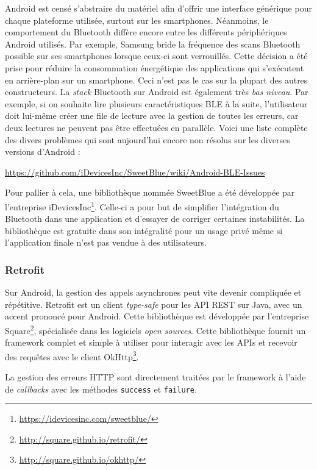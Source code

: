 Android est censé s'abstraire du matériel afin d'offrir une interface générique pour chaque plateforme utilisée, surtout sur les smartphones. Néanmoins, le comportement du Bluetooth diffère encore entre les différents périphériques Android utilisés. Par exemple, Samsung bride la fréquence des scans Bluetooth possible sur ses smartphones lorsque ceux-ci sont verrouillés. Cette décision a été prise pour réduire la consommation énergétique des applications qui s'exécutent en arrière-plan sur un smartphone. Ceci n'est pas le cas sur la plupart des autres constructeurs. La \textit{stack} Bluetooth sur Android est également très \textit{bas niveau}. Par exemple, si on souhaite lire plusieurs caractéristiques BLE à la suite, l'utilisateur doit lui-même créer une file de lecture avec la gestion de toutes les erreurs, car deux lectures ne peuvent pas être effectuées en parallèle. Voici une liste complète des divers problèmes qui sont aujourd'hui encore non résolus sur les diverses versions d'Android :
\begin{center}
    \url{https://github.com/iDevicesInc/SweetBlue/wiki/Android-BLE-Issues}
\end{center}

Pour pallier à cela, une bibliothèque nommée SweetBlue a été développée par l'entreprise iDevicesInc\footnote{\url{https://idevicesinc.com/sweetblue/}}. Celle-ci a pour but de simplifier l'intégration du Bluetooth dans une application et d'essayer de corriger certaines instabilités. La bibliothèque est gratuite dans son intégralité pour un usage privé même si l'application finale n'est pas vendue à des utilisateurs.


\subsubsection{Retrofit}

Sur Android, la gestion des appels asynchrones peut vite devenir compliquée et répétitive. Retrofit est un client \textit{type-safe} pour les API REST sur Java, avec un accent prononcé pour Android. Cette bibliothèque est développée par l'entreprise Square\footnote{\url{http://square.github.io/retrofit/}}, spécialisée dans les logiciels \textit{open sources}. Cette bibliothèque fournit un framework complet et simple à utiliser pour interagir avec les APIs et recevoir des requêtes avec le client OkHttp\footnote{\url{http://square.github.io/okhttp/}}.

La gestion des erreurs HTTP sont directement traitées par le framework à l'aide de \textit{callbacks} avec les méthodes \texttt{success} et \texttt{failure}.


